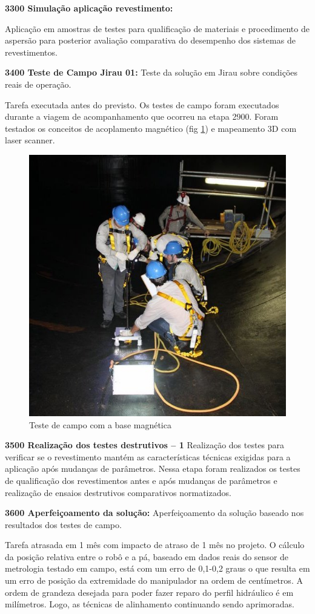\noindent
\textbf{3300 Simulação aplicação revestimento:}

Aplicação em amostras de testes para qualificação de materiais e procedimento de aspersão para posterior avaliação comparativa do desempenho dos sistemas de revestimentos.


\noindent
\textbf{3400 Teste de Campo Jirau 01:} Teste da solução  em Jirau sobre
condições reais de operação.

Tarefa executada antes do previsto. Os testes de campo foram executados durante
a viagem de acompanhamento que ocorreu na etapa 2900. Foram testados os
conceitos de acoplamento magnético (fig \ref{fig::teste_base}) e mapeamento 3D
com laser scanner.
\begin{figure}
\centering
\label{fig::teste_base}
\includegraphics[width=0.6\columnwidth]{figs/base}
\caption{Teste de campo com a base  magnética}
\end{figure}

\noindent
\textbf{3500 Realização dos testes destrutivos – 1}
Realização dos testes para verificar se o revestimento mantém as 
características técnicas exigidas para a aplicação após mudanças de parâmetros. Nessa etapa foram realizados os testes de qualificação dos revestimentos antes e após mudanças de parâmetros e realização de ensaios destrutivos comparativos normatizados. 

\noindent
\textbf{3600 Aperfeiçoamento da solução:}
Aperfeiçoamento da solução baseado nos resultados dos testes de campo. 

Tarefa atrasada em 1 mês com impacto de atraso de 1 mês no projeto. O cálculo da
posição relativa entre o robô e a pá, baseado em dados reais do sensor de
metrologia testado em campo, está com um erro de 0,1-0,2 graus o que resulta em
um erro de posição da extremidade do manipulador na ordem de centímetros. A
ordem de grandeza desejada para poder fazer reparo do perfil hidráulico é em
milímetros. Logo, as técnicas de alinhamento continuando sendo aprimoradas.

